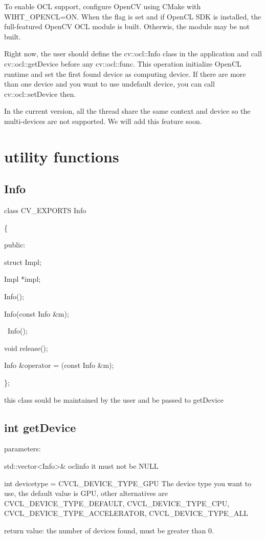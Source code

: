 \documentclass{article}
\begin{document}
To enable OCL support, configure OpenCV using CMake with WIHT\_OPENCL=ON. When the flag is set and if OpenCL SDK is installed, the full-featured OpenCV OCL module is built. Otherwis, the module may be not built.

Right now, the user should define the cv::ocl::Info class in the application and call cv::ocl::getDevice before any cv::ocl::func. This operation initialize OpenCL runtime and set the first found device as computing device. If there are more than one device and you want to use undefault device, you can call cv::ocl::setDevice then.

In the current version, all the thread share the same context and device so the multi-devices are not supported. We will add this feature soon.

\section{utility functions}

\subsection{Info}
class CV\_EXPORTS Info

\{

public:

	struct Impl;

	Impl *impl;

	Info();

	Info(const Info \&m);

	~Info();

	void release();

	Info \&operator = (const Info \&m);

\};

this class sould be maintained by the user and be passed to getDevice

\subsection{int getDevice}


parameters:

std::vector<Info>\& oclinfo  it must not be NULL

int devicetype = CVCL\_DEVICE\_TYPE\_GPU The device type you want to use, the default value is GPU, other alternatives are CVCL\_DEVICE\_TYPE\_DEFAULT, CVCL\_DEVICE\_TYPE\_CPU, CVCL\_DEVICE\_TYPE\_ACCELERATOR, CVCL\_DEVICE\_TYPE\_ALL

return value: the number of devices found, must be greater than 0.
\end{document}
